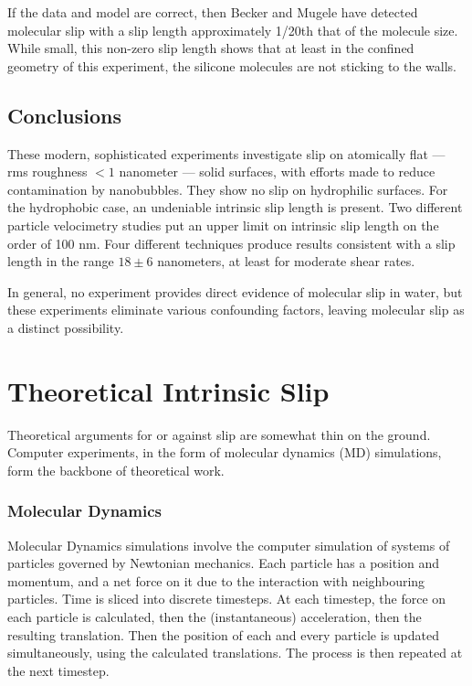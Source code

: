 \documentclass[12pt, a4paper, twoside, openright]{book}
\begin{document}
If the data and model are correct, then Becker and Mugele have detected molecular slip with a slip length approximately 1/20th that of the molecule size.  While small, this non-zero slip length shows that at least in the confined geometry of this experiment, the silicone molecules are not sticking to the walls.

\subsection{Conclusions}

These modern, sophisticated experiments investigate slip on atomically flat --- rms roughness $< 1$ nanometer --- solid surfaces, with efforts made to reduce contamination by nanobubbles.  They show no slip on hydrophilic surfaces. For the hydrophobic case, an undeniable intrinsic slip length is present. Two different particle velocimetry studies put an upper limit on intrinsic slip length on the order of 100 nm.  Four different techniques produce results consistent with a slip length in the range $18 \pm 6$ nanometers, at least for moderate shear rates.

In general, no experiment provides direct evidence of molecular slip in water, but these experiments eliminate various confounding factors, leaving molecular slip as a distinct possibility.

\section{Theoretical Intrinsic Slip}

Theoretical arguments for or against slip are somewhat thin on the ground. Computer experiments, in the form of molecular dynamics (MD) simulations, form the backbone of theoretical work.

\subsubsection{Molecular Dynamics}

Molecular Dynamics simulations involve the computer simulation of systems of particles governed by Newtonian mechanics.  Each particle has a position and momentum, and a net force on it due to the interaction with neighbouring particles. Time is sliced into discrete timesteps. At each timestep, the force on each particle is calculated, then the (instantaneous) acceleration, then the resulting translation. Then the position of each and every particle is updated simultaneously, using the calculated translations. The process is then repeated at the next timestep.
\end{document}
